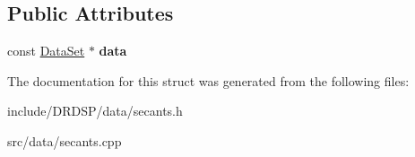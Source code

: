 \subsection*{Public Attributes}
\begin{DoxyCompactItemize}
\item 
\hypertarget{struct_d_r_d_s_p_1_1_secants_data_a1f2646fe6bfc11fdcf779344fc8d532c}{const \hyperlink{struct_d_r_d_s_p_1_1_data_set}{Data\-Set} $\ast$ {\bfseries data}}\label{struct_d_r_d_s_p_1_1_secants_data_a1f2646fe6bfc11fdcf779344fc8d532c}

\end{DoxyCompactItemize}


The documentation for this struct was generated from the following files\-:\begin{DoxyCompactItemize}
\item 
include/\-D\-R\-D\-S\-P/data/secants.\-h\item 
src/data/secants.\-cpp\end{DoxyCompactItemize}

